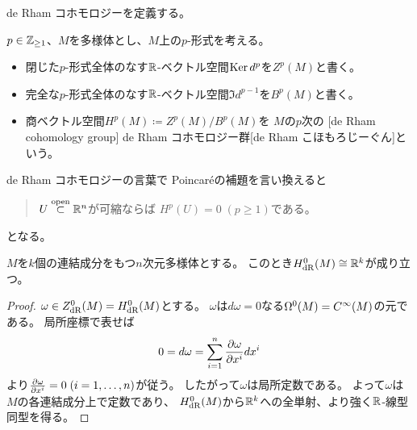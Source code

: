 \documentclass[report]{jlreq}
\begin{document}
de Rham コホモロジーを定義する。

\begin{definition}
    $p \in \mathbb{Z}_{\ge 1}$、$M$を多様体とし、$M$上の$p$-形式を考える。
    \begin{itemize}
        \item 閉じた$p$-形式全体のなす$\mathbb{R}$-ベクトル空間$\operatorname{\mathrm{Ker}} d^p$を$Z^p(M)$と書く。
        \item 完全な$p$-形式全体のなす$\mathbb{R}$-ベクトル空間$\Im d^{p - 1}$を$B^p(M)$と書く。
        \item 商ベクトル空間$H^p(M) \coloneqq Z^p(M) / B^p(M)$を
            $M$の$p$次の
            [de Rham cohomology group]
            {de Rham コホモロジー群}[de Rham こほもろじーぐん]という。
    \end{itemize}
\end{definition}

\begin{remark}
    de Rham コホモロジーの言葉で Poincar\'{e}の補題を言い換えると
    \begin{quotation}
        $U \stackrel{\text{open}}{\subset} \mathbb{R}^n$が可縮ならば
        $H^p(U) = 0 \; (p \ge 1)$である。
    \end{quotation}
    となる。
\end{remark}

\begin{proposition}
    $M$を$k$個の連結成分をもつ$n$次元多様体とする。
    このとき$H_{\mathrm{dR}}^0(M) \cong \mathbb{R}^k$が成り立つ。
\end{proposition}

\begin{proof}
    $\omega \in Z_{\mathrm{dR}}^0(M) = H_{\mathrm{dR}}^0(M)$とする。
    $\omega$は$d\omega = 0$なる$\Omega^0(M) = C^\infty(M)$の元である。
    局所座標で表せば
    \begin{equation}
        0 = d\omega = \sum_{i = 1}^n \deldel[\omega]{x^i} dx^i
    \end{equation}
    より$\deldel[\omega]{x^i} = 0 \; (i = 1, \dots, n)$が従う。
    したがって$\omega$は局所定数である。
    よって$\omega$は$M$の各連結成分上で定数であり、
    $H_{\mathrm{dR}}^0(M)$から$\mathbb{R}^k$への全単射、より強く$\mathbb{R}$-線型同型を得る。
\end{proof}
\end{document}
